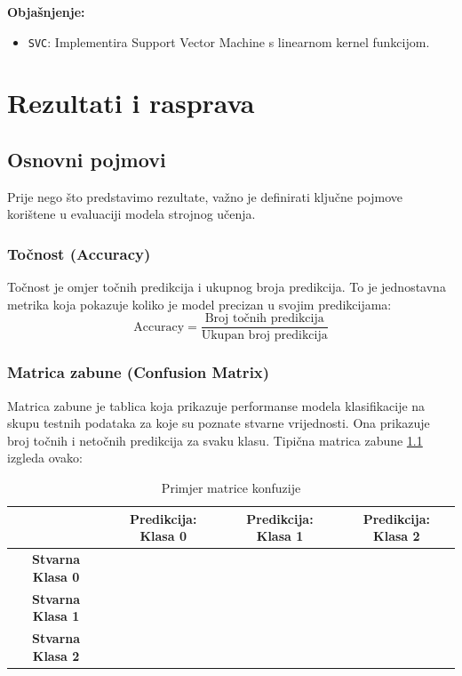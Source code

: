 \documentclass[zavrsnirad,upload]{fer}
\begin{document}
\noindent \textbf{Objašnjenje:}
\begin{itemize}
	\item \texttt{SVC}: Implementira Support Vector Machine s linearnom kernel funkcijom.
\end{itemize}


\chapter{Rezultati i rasprava}
\label{pog:rezultati_i_rasprava}

\section{Osnovni pojmovi}

Prije nego što predstavimo rezultate, važno je definirati ključne pojmove korištene u evaluaciji modela strojnog učenja.

\subsection{Točnost (Accuracy)}

Točnost je omjer točnih predikcija i ukupnog broja predikcija. To je jednostavna metrika koja pokazuje koliko je model precizan u svojim predikcijama:
\begin{equation}
	\text{Accuracy} = \frac{\text{Broj točnih predikcija}}{\text{Ukupan broj predikcija}}
\end{equation}

\subsection{Matrica zabune (Confusion Matrix)}

Matrica zabune je tablica koja prikazuje performanse modela klasifikacije na skupu testnih podataka za koje su poznate stvarne vrijednosti. Ona prikazuje broj točnih i netočnih predikcija za svaku klasu. Tipična matrica zabune \ref{tab:conf_matrix} izgleda ovako:

\begin{table}[h]
	\centering
	\begin{tabular}{c|c|c|c}
		& \textbf{Predikcija: Klasa 0} & \textbf{Predikcija: Klasa 1} & \textbf{Predikcija: Klasa 2} \\ \hline
		\textbf{Stvarna Klasa 0} & \cellcolor{green!25} & & \\ \hline
		\textbf{Stvarna Klasa 1} & & \cellcolor{green!25} & \\ \hline
		\textbf{Stvarna Klasa 2} & & & \cellcolor{green!25} \\ 
	\end{tabular}
	\caption{Primjer matrice konfuzije}
	\label{tab:conf_matrix}
\end{table}
\end{document}
